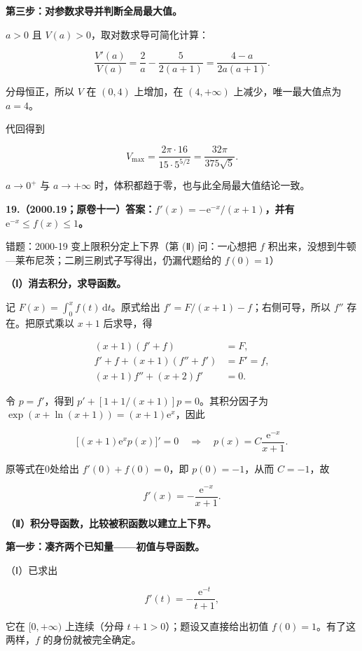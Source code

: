 \documentclass[UTF8,11pt,fontset=windows]{ctexart}
\begin{document}
\textbf{第三步：对参数求导并判断全局最大值。}

$a>0$ 且 $V(a)>0$，取对数求导可简化计算：

$$
\frac{V'(a)}{V(a)}=\frac2a-\frac5{2(a+1)}
=\frac{4-a}{2a(a+1)}.
$$

分母恒正，所以 $V$ 在 $(0,4)$ 上增加，在 $(4,+\infty)$ 上减少，唯一最大值点为 $a=4$。

代回得到

$$
V_{\max}=\frac{2\pi\cdot16}{15\cdot5^{5/2}}
=\frac{32\pi}{375\sqrt5}.
$$

$a\to0^+$ 与 $a\to+\infty$ 时，体积都趋于零，也与此全局最大值结论一致。

\clearpage

\textbf{19.（2000.19；原卷十一）答案：$f'(x)=-\mathrm e^{-x}/(x+1)$，并有 $\mathrm e^{-x}\le f(x)\le1$。}

\begingroup\color{gray}错题：2000-19 变上限积分定上下界（第 (Ⅱ) 问：一心想把 $f$ 积出来，没想到牛顿—莱布尼茨；二刷三刷式子写得出，仍漏代题给的 $f(0)=1$）\par\endgroup

\textbf{（Ⅰ）消去积分，求导函数。}

记 $F(x)=\int_0^x f(t)\,\mathrm dt$。原式给出 $f'=F/(x+1)-f$；右侧可导，所以 $f''$ 存在。把原式乘以 $x+1$ 后求导，得

$$
\begin{aligned}
(x+1)(f'+f)&=F,\\
f'+f+(x+1)(f''+f')&=F'=f,\\
(x+1)f''+(x+2)f'&=0.
\end{aligned}
$$

令 $p=f'$，得到 $p'+[1+1/(x+1)]p=0$。其积分因子为 $\exp(x+\ln(x+1))=(x+1)\mathrm e^x$，因此

$$
\bigl[(x+1)\mathrm e^xp(x)\bigr]'=0
\quad\Longrightarrow\quad
p(x)=C\frac{\mathrm e^{-x}}{x+1}.
$$

原等式在0处给出 $f'(0)+f(0)=0$，即 $p(0)=-1$，从而 $C=-1$，故

$$
\boxed{f'(x)=-\frac{\mathrm e^{-x}}{x+1}.}
$$

\textbf{（Ⅱ）积分导函数，比较被积函数以建立上下界。}

\textbf{第一步：凑齐两个已知量——初值与导函数。}

（Ⅰ）已求出

$$
f'(t)=-\frac{\mathrm e^{-t}}{t+1},
$$

它在 $[0,+\infty)$ 上连续（分母 $t+1>0$）；题设又直接给出初值 $f(0)=1$。有了这两样，$f$ 的身份就被完全确定。
\end{document}
